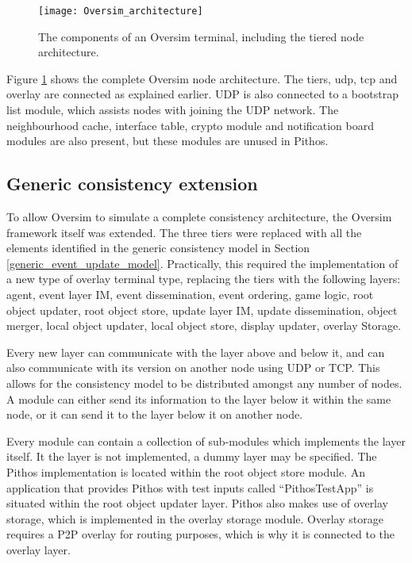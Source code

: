 \begin{figure}[htbp]
 \centering
 \texttt{[image: Oversim\_architecture]}
 \caption{The components of an Oversim terminal, including the tiered node architecture.}
 \label{fig_oversim_architecture}
\end{figure}

Figure \ref{fig_oversim_architecture} shows the complete Oversim node architecture. The tiers, udp, tcp and overlay are connected as explained earlier. UDP is also connected to a bootstrap list module, which assists nodes with joining the UDP network. The neighbourhood cache, interface table, crypto module and notification board modules are also present, but these modules are unused in Pithos.

    \subsection{Generic consistency extension}
    \label{generic_consistency_extension}


To allow Oversim to simulate a complete consistency architecture, the Oversim framework itself was extended. The three tiers were replaced with all the elements identified in the generic consistency model in Section \ref{generic_event_update_model}. Practically, this required the implementation of a new type of overlay terminal type, replacing the tiers with the following layers: agent, event layer IM, event dissemination, event ordering, game logic, root object updater, root object store, update layer IM, update dissemination, object merger, local object updater, local object store, display updater, overlay Storage.

Every new layer can communicate with the layer above and below it, and can also communicate with its version on another node using UDP or TCP. This allows for the consistency model to be distributed amongst any number of nodes. A module can either send its information to the layer below it within the same node, or it can send it to the layer below it on another node.

Every module can contain a collection of sub-modules which implements the layer itself. It the layer is not implemented, a dummy layer may be specified. The Pithos implementation is located within the root object store module. An application that provides Pithos with test inputs called ``PithosTestApp'' is situated within the root object updater layer. Pithos also makes use of overlay storage, which is implemented in the overlay storage module. Overlay storage requires a P2P overlay for routing purposes, which is why it is connected to the overlay layer.

